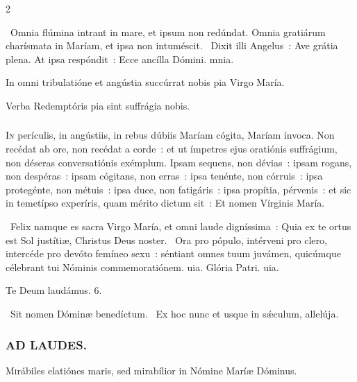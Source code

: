 \documentclass[9pt,twoside]{extarticle}
\begin{document}
\begin{multicols}{2}
{{\begin{tightlist}{}
\item {}~Omnia flúmina intrant in mare, et ipsum non redúndat. \textred{*} Omnia gratiárum charísmata in Maríam, et ipsa non intuméscit. ~Dixit illi Angelus~: Ave grátia plena. At ipsa respóndit~: Ecce ancílla Dómini. mnia.
\item {\small {} In omni tribulatióne et angústia succúrrat nobis pia Virgo María.}
\item {\small {}}
\item {\small {} Verba Redemptóris pia sint suffrágia nobis.}
\end{tightlist}

\subsubsection*{\center {}}
\lettrine{I}n perículis, in angústiis, in rebus dúbiis Maríam cógita, Maríam ínvoca. Non recédat ab ore, non recédat a corde~: et ut ímpetres ejus oratiónis suffrágium, non déseras conversatiónis exémplum. Ipsam sequens, non dévias~: ipsam rogans, non despéras~: ipsam cógitans, non erras~: ipsa tenénte, non córruis~: ipsa protegénte, non métuis~: ipsa duce, non fatigáris~: ipsa propítia, pérvenis~: et sic in temetípso experíris, quam mérito dictum sit~: Et nomen Vírginis María.

\begin{tightlist}{}
\item {}~Felix namque es sacra Virgo María, et omni laude digníssima~: \textred{*} Quia ex te ortus est Sol justítiæ, Christus Deus noster. ~Ora pro pópulo, intérveni pro clero, intercéde pro devóto femíneo sexu~: séntiant omnes tuum juvámen, quicúmque célebrant tui Nóminis commemoratiónem. uia. Glória Patri. uia.
\item Te Deum laudámus. 6.
\item {}~Sit nomen Dóminæ benedíctum. ~Ex hoc nunc et usque in sǽculum, allelúja.
\end{tightlist}

\subsubsection*{\center \textsc{AD LAUDES.}}
\begin{center}\end{center}
\lettrine{M}irábiles elatiónes maris, sed mirabílior in Nómine Maríæ Dóminus.

}}
\end{multicols}
\end{document}
